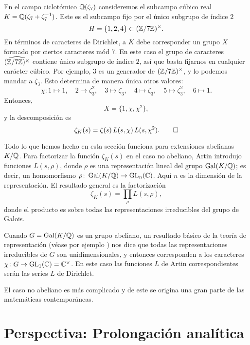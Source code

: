 \begin{ejemplo}
  \label{ej:Q-zeta-7-real-zeta-descomp}
  En el campo ciclotómico $\mathbb{Q} (\zeta_7)$ consideremos el subcampo cúbico real
  $K = \mathbb{Q} (\zeta_7 + \zeta_7^{-1})$. Este es el subcampo fijo por el único
  subgrupo de índice $2$
  $$H = \{ 1, 2, 4 \} \subset (\mathbb{Z}/7\mathbb{Z})^\times.$$
  En términos de caracteres de Dirichlet, a $K$ debe corresponder un grupo
  $X$ formado por ciertos caracteres mód $7$. En este caso el grupo de
  caracteres $\widehat{(\mathbb{Z}/7\mathbb{Z})^\times}$ contiene único subgrupo de índice $2$,
  así que basta fijarnos en cualquier carácter cúbico. Por ejemplo, $3$ es un
  generador de $(\mathbb{Z}/7\mathbb{Z})^\times$, y lo podemos mandar a $\zeta_3$. Esto
  determina de manera única otros valores:
  \[ \chi\colon 1\mapsto 1, \quad
  2 \mapsto \zeta_3^2, \quad
  3 \mapsto \zeta_3, \quad
  4 \mapsto \zeta_3, \quad
  5 \mapsto \zeta_3^2, \quad
  6 \mapsto 1. \]
  Entonces,
  $$X = \{ 1, \chi, \chi^2 \},$$
  y la descomposición es
  \[ \zeta_K (s) = \zeta (s) \, L (s,\chi) \, L (s,\chi^2). \qedhere \]
\end{ejemplo}

\begin{comentario}
  Todo lo que hemos hecho en esta sección funciona para extensiones abelianas
  $K/\mathbb{Q}$. Para factorizar la función $\zeta_K (s)$ en el caso no abeliano,
  Artin introdujo funciones $L (s,\rho)$, donde $\rho$ es una representación
  lineal del grupo $\operatorname{Gal} (K/\mathbb{Q})$; es decir, un homomorfismo
  $\rho\colon \operatorname{Gal} (K/\mathbb{Q}) \to \operatorname{GL}_n (\mathbb{C})$. Aquí $n$ es la dimensión de
  la representación. El resultado general es la factorización
  $$\zeta_K (s) = \prod_\rho L (s,\rho),$$
  donde el producto es sobre todas las representaciones irreducibles del grupo
  de Galois.

  Cuando $G = \operatorname{Gal} (K/\mathbb{Q})$ es un grupo abeliano, un resultado básico de
  la teoría de representación (véase por ejemplo \cite{Serre-RLGF}) nos dice que
  todas las representaciones irreducibles de $G$ son unidimensionales, y
  entonces corresponden a los caracteres
  $\chi\colon G \to \operatorname{GL}_1 (\mathbb{C}) = \mathbb{C}^\times$. En este caso las funciones $L$
  de Artin correspondientes serán las series $L$ de Dirichlet.

  El caso no abeliano es más complicado y de este se origina una gran parte de
  las matemáticas contemporáneas.
\end{comentario}


\section{Perspectiva: Prolongación analítica}

